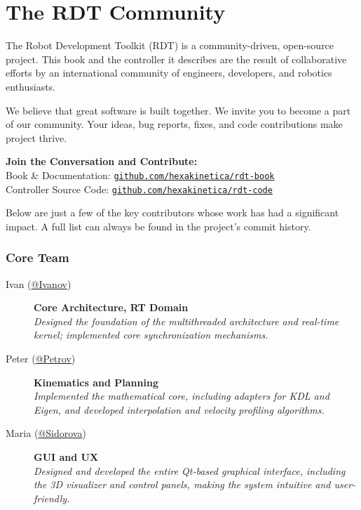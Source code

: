\newpage
\chapter*{The RDT Community} %

The Robot Development Toolkit (RDT) is a community-driven, open-source project. This book and the controller it describes are the result of collaborative efforts by an international community of engineers, developers, and robotics enthusiasts. 

We believe that great software is built together. We invite you to become a part of our community. Your ideas, bug reports, fixes, and code contributions make project thrive.

\begin{center}
    \large
    \textbf{Join the Conversation and Contribute:}\\[1ex]
    Book \& Documentation: \href{https://github.com/hexakinetica/rdt-book}{\texttt{github.com/hexakinetica/rdt-book}}\\[1ex]
    Controller Source Code: \href{https://github.com/hexakinetica/rdt-code}{\texttt{github.com/hexakinetica/rdt-code}}
\end{center}

Below are just a few of the key contributors whose work has had a significant impact. A full list can always be found in the project's commit history.

\subsection*{Core Team}

\begin{description}
    \item[Ivan (\href{https://github.com/ivanov-ivan-rdt}{@Ivanov})] \hfill \textbf{Core Architecture, RT Domain} \\
    \textit{Designed the foundation of the multithreaded architecture and real-time kernel; implemented core synchronization mechanisms.}

    \item[Peter (\href{https://github.com/petrov-petr-rdt}{@Petrov})] \hfill \textbf{Kinematics and Planning} \\
    \textit{Implemented the mathematical core, including adapters for KDL and Eigen, and developed interpolation and velocity profiling algorithms.}

    \item[Maria (\href{https://github.com/sidorova-maria-rdt}{@Sidorova})] \hfill \textbf{GUI and UX} \\
    \textit{Designed and developed the entire Qt-based graphical interface, including the 3D visualizer and control panels, making the system intuitive and user-friendly.}
\end{description}

